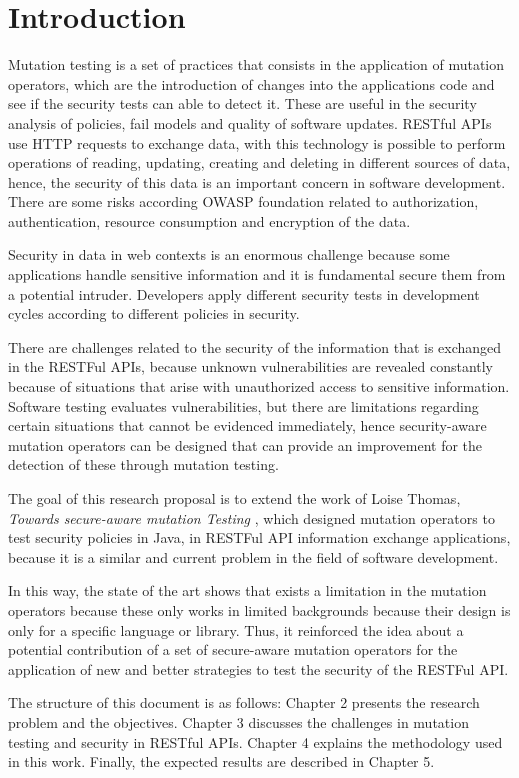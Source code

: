 \chapter*{Introduction}

Mutation testing is a set of practices that consists in the application of mutation operators, which are the introduction of changes into the applications code and see if the security tests can able to detect it. These are useful in the security analysis of policies\cite{8967426}, fail models\cite{6569774} and quality of software updates\cite{kravets2012feasibility}. RESTful APIs use HTTP requests to exchange data, with this technology is possible to perform operations of reading, updating, creating and deleting in different sources of data, hence, the security of this data is an important concern in software development. There are some risks according OWASP foundation related to authorization, authentication, resource consumption and encryption of the data.

Security in data in web contexts is an enormous challenge because some applications handle sensitive information and it is fundamental secure them from a potential intruder. Developers apply different security tests in development cycles according to different policies in security. 

There are challenges related to the security of the information that is exchanged in the RESTFul APIs, because unknown vulnerabilities are revealed constantly because of situations that arise with unauthorized access to sensitive information. Software testing evaluates vulnerabilities, but there are limitations regarding certain situations that cannot be evidenced immediately, hence security-aware mutation operators can be designed that can provide an improvement for the detection of these through mutation testing.

The goal of this research proposal is to extend the work of Loise Thomas, \textit{Towards secure-aware mutation Testing} \cite{Loise2017}, which designed mutation operators to test security policies in Java, in RESTFul API information exchange applications, because it is a similar and current problem in the field of software development.

In this way, the state of the art shows that exists a limitation in the mutation operators because these only works in limited backgrounds because their design is only for a specific language or library. Thus, it reinforced the idea about a potential contribution of a set of secure-aware mutation operators for the application of new and better strategies to test the security of the RESTFul API.

The structure of this document is as follows: Chapter 2 presents the research problem and the objectives. Chapter 3 discusses the challenges in mutation testing and security in RESTful APIs. Chapter 4 explains the methodology used in this work. Finally, the expected results are described in Chapter 5.